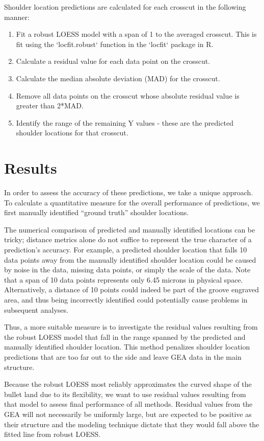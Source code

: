 \documentclass[]{article}
\begin{document}
Shoulder location predictions are calculated for each crosscut in the
following manner:

\begin{enumerate}
\item Fit a robust LOESS model with a span of 1 to the averaged crosscut. This is fit using the `locfit.robust` function in the `locfit` package in R.
\item Calculate a residual value for each data point on the crosscut.  
\item Calculate the median absolute deviation (MAD) for the crosscut.  
\item Remove all data points on the crosscut whose absolute residual value is greater than 2*MAD.  
\item Identify the range of the remaining Y values - these are the predicted shoulder locations for that crosscut.   
\end{enumerate}

\section{Results}

In order to assess the accuracy of these predictions, we take a unique
approach. To calculate a quantitative measure for the overall
performance of predictions, we first manually identified ``ground
truth'' shoulder locations.

The numerical comparison of predicted and manually identified locations
can be tricky; distance metrics alone do not suffice to represent the
true character of a prediction's accuracy. For example, a predicted
shoulder location that falls 10 data points away from the manually
identified shoulder location could be caused by noise in the data,
missing data points, or simply the scale of the data. Note that a span
of 10 data points represents only 6.45 microns in physical space.
Alternatively, a distance of 10 points could indeed be part of the
groove engraved area, and thus being incorrectly identified could
potentially cause problems in subsequent analyses.

Thus, a more suitable measure is to investigate the residual values
resulting from the robust LOESS model that fall in the range spanned by
the predicted and manually identified shoulder location. This method
penalizes shoulder location predictions that are too far out to the side
and leave GEA data in the main structure.

Because the robust LOESS most reliably approximates the curved shape of
the bullet land due to its flexibility, we want to use residual values
resulting from that model to assess final performance of all methods.
Residual values from the GEA will not necessarily be uniformly large,
but are expected to be positive as their structure and the modeling
technique dictate that they would fall above the fitted line from robust
LOESS.
\end{document}
